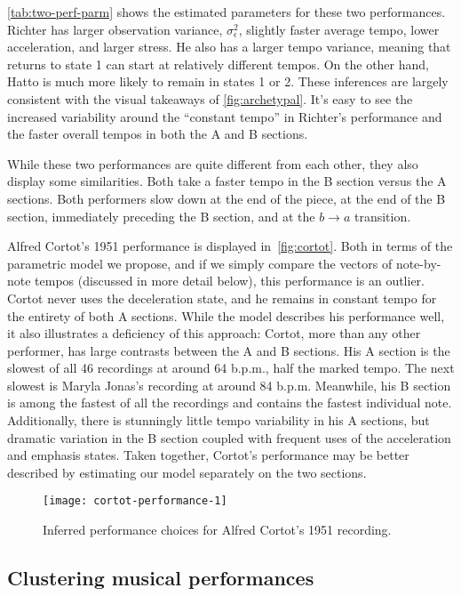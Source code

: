 \documentclass[12pt]{article}
\begin{document}
\autoref{tab:two-perf-parm} shows the estimated parameters for these
two performances. Richter has larger observation variance,
$\sigma^2_{\epsilon}$, slightly faster average tempo, lower
acceleration, and larger stress. He also has a larger tempo variance,
meaning that returns to state 1 can start at relatively different
tempos. On the other hand, Hatto is much more
likely to remain in states 1 or 2. These inferences are largely
consistent with the visual takeaways of \autoref{fig:archetypal}. It's
easy to see the increased variability around the ``constant tempo'' in
Richter's performance and the faster overall tempos in both the A and
B sections.

While these two performances are quite different from each other, they
also display some similarities. Both take a faster tempo in the B
section versus the A sections. Both performers slow down at the end of
the piece, at the end of the B section, immediately preceding the B section, and at the
$b\rightarrow a$ transition.

Alfred Cortot's 1951 performance is displayed
in~\autoref{fig:cortot}. Both in terms of the parametric model we
propose, and if we simply compare the vectors of note-by-note tempos
(discussed in more detail below), this performance is an
outlier. Cortot never uses the deceleration state, and he remains in
constant tempo for the entirety of both A sections. While the model
describes his performance well, it also illustrates a deficiency of
this approach: Cortot, more than any other performer, has large
contrasts between the A and B sections. His A section is the slowest
of all 46 recordings at around 64 b.p.m., half the marked
tempo. The next slowest is Maryla Jonas's recording at around 84
b.p.m. Meanwhile, his B section is among the fastest of all the
recordings and contains the fastest individual note. Additionally,
there is stunningly little tempo variability in his A sections, but
dramatic variation in the B section coupled with frequent uses of the
acceleration and emphasis states. Taken together, Cortot's performance
may be better described by estimating our model separately on the two sections.
\begin{figure}[t]
  \centering
    \texttt{[image: cortot-performance-1]}
  \caption{Inferred performance choices for Alfred Cortot's 1951
    recording.}
  \label{fig:cortot}
\end{figure}

\subsection{Clustering musical performances}
\label{sec:clust-music-perf}
\end{document}
